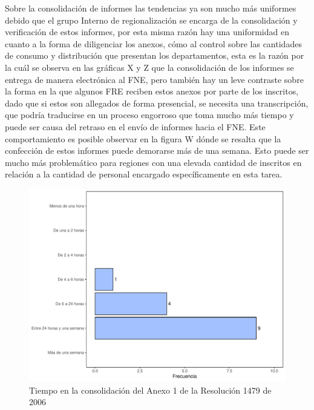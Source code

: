 \documentclass[
]{book}
\begin{document}
Sobre la consolidación de informes las tendencias ya son mucho más uniformes debido que el grupo Interno de regionalización se encarga de la consolidación y verificación de estos informes, por esta misma razón hay una uniformidad en cuanto a la forma de diligenciar los anexos, cómo al control sobre las cantidades de consumo y distribución que presentan los departamentos, esta es la razón por la cuál se observa en las gráficas X y Z que la consolidación de los informes se entrega de manera electrónica al FNE, pero también hay un leve contraste sobre la forma en la que algunos FRE reciben estos anexos por parte de los inscritos, dado que si estos son allegados de forma presencial, se necesita una transcripción, que podría traducirse en un proceso engorroso que toma mucho más tiempo y puede ser causa del retraso en el envío de informes hacia el FNE. Este comportamiento es posible observar en la figura W dónde se resalta que la confección de estos informes puede demorarse más de una semana. Esto puede ser mucho más problemático para regiones con una elevada cantidad de inscritos en relación a la cantidad de personal encargado específicamente en esta tarea.

\begin{figure}
\includegraphics[width=0.85\linewidth]{InformeFinal_files/figure-latex/TiemposConsolidacionA1-1} \caption{Tiempo en la consolidación del Anexo 1 de la Resolución 1479 de 2006}\label{fig:TiemposConsolidacionA1}
\end{figure}
\end{document}
